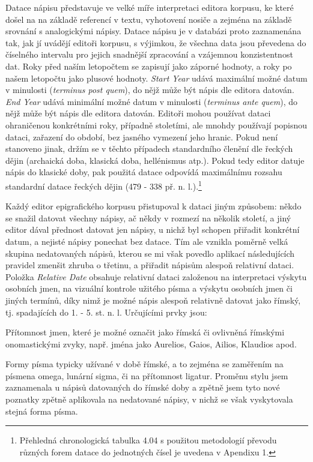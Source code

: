 Datace nápisu představuje ve velké míře interpretaci editora korpusu, ke které došel na na základě referencí v textu, vyhotovení nosiče a zejména na základě srovnání s analogickými nápisy. Datace nápisu je v databázi proto zaznamenána tak, jak jí uvádějí editoři korpusu, s výjimkou, že všechna data jsou převedena do číselného intervalu pro jejich snadnější zpracování a vzájemnou konzistentnost dat. Roky před naším letopočtem se zapisují jako záporné hodnoty, a roky po našem letopočtu jako plusové hodnoty. {\em Start Year} udává maximální možné datum v minulosti ({\em terminus post quem}), do nějž může být nápis dle editora datován. {\em End Year} udává minimální možné datum v minulosti ({\em terminus ante quem}), do nějž může být nápis dle editora datován. Editoři mohou používat dataci ohraničenou konkrétními roky, případně stoletími, ale mnohdy používají popisnou dataci, zařazení do období, bez jasného vymezení jeho hranic. Pokud není stanoveno jinak, držím se v těchto případech standardního členění dle řeckých dějin (archaická doba, klasická doba, hellénismus atp.). Pokud tedy editor datuje nápis do klasické doby, pak použitá datace odpovídá maximálnímu rozsahu standardní datace řeckých dějin (479 - 338 př. n. l.).\footnote{Přehledná chronologická tabulka 4.04 s použitou metodologií převodu různých forem datace do jednotných čísel je uvedena v Apendixu 1.}

Každý editor epigrafického korpusu přistupoval k dataci jiným způsobem: někdo se snažil datovat všechny nápisy, ač někdy v rozmezí na několik století, a jiný editor dával přednost datovat jen nápisy, u nichž byl schopen přiřadit konkrétní datum, a nejisté nápisy ponechat bez datace. Tím ale vznikla poměrně velká skupina nedatovaných nápisů, kterou se mi však povedlo aplikací následujících pravidel zmenšit zhruba o třetinu, a přiřadit nápisům alespoň relativní dataci. Položka {\em Relative Date} obsahuje relativní dataci založenou na interpretaci výskytu osobních jmen, na vizuální kontrole užitého písma a výskytu osobních jmen či jiných termínů, díky nimž je možné nápis alespoň relativně datovat jako římský, tj. spadajících do 1. - 5. st. n. l. Určujícími prvky jsou:

\startitemize
\item
  \startblockquote
  Přítomnost jmen, které je možné označit jako římská či ovlivněná římskými onomastickými zvyky, např. jména jako Aurelios, Gaios, Ailios, Klaudios apod.
  \stopblockquote
\item
  \startblockquote
  Formy písma typicky užívané v době římské, a to zejména se zaměřením na písmena omega, lunární sigma, či na přítomnost ligatur. Proměnu stylu jsem zaznamenala u nápisů datovaných do římské doby a zpětně jsem tyto nové poznatky zpětně aplikovala na nedatované nápisy, v nichž se však vyskytovala stejná forma písma.
  \stopblockquote
\stopitemize

